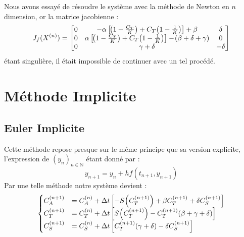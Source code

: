 \documentclass[12pt]{article}
\theoremstyle{saav}
\newcommand{\parr}[1]{\hspace{-0.05cm}\left(#1 \right)}
\newcommand{\rect}[1]{\left[ #1 \right]}
\newcommand{\mb}[1]{\mathbb{#1}}
\begin{document}
			
			Nous avons essayé de résoudre le système avec la méthode de Newton en $n$ dimension, or la matrice jacobienne :
			\begin{equation*}
				J_{f}(X^{(n)}) = \begin{bmatrix}
					0 & - \alpha\rect{\parr{1 - \frac{C_{T}}{K}} + C_{T} \parr{1 - \frac{1}{K}}} + \beta& \delta \\
					0& \alpha\rect{\parr{1 - \frac{C_{T}}{K}} + C_{T}\parr{1 - \frac{1}{K}}} - \parr{\beta + \delta+\gamma}&0 \\
					0&\gamma + \delta  & - \delta 
				\end{bmatrix}
			\end{equation*}
			étant singulière, il était impossible de continuer avec un tel procédé.
			
	
	
	
	
	\section{Méthode Implicite}
		\subsection{Euler Implicite}
		Cette méthode repose presque sur le même principe que sa version explicite, l'expression de $(y_{n})_{n\in \mb{N}}$ étant donné par :
			\begin{equation}
				y_{n+1}=y_n+hf(t_{n+1},y_{n+1})
				\label{eq:euler_imp}
			\end{equation}
		Par une telle méthode notre système devient : 
		\begin{equation*}
			\begin{cases}
				C_{A}^{(n+1)} &= C_{A}^{(n)} + \Delta t \rect{- S \parr{C_{T}^{(n+1)}} + \beta C_{T}^{(n+1)} + \delta C_{S}^{(n+1)} }\\
				
				C_{T}^{(n+1)} &= C_{T}^{(n)} + \Delta t \rect{ S\parr{C_{T}^{(n+1)}} - C_{T}^{(n+1)}(\beta + \gamma + \delta ) }
				\\
				C_{S}^{(n+1)} &= C_{S}^{(n)} + \Delta t  \rect{C_{T}^{(n+1)}(\gamma + \delta) - \delta C_{S}^{(n+1)}}
				
			\end{cases}
		\end{equation*}
		
\end{document}
